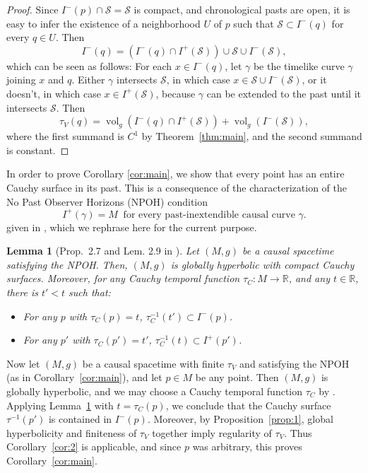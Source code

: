 \documentclass[a4paper,11pt]{amsart}
\newtheorem{lemma}[theorem]{{Lemma}}%
\newcommand{\R}{\mathbb{R}}
\newcommand{\Vol}{\operatorname{vol}_g}
\newcommand{\CS}{\mathcal{S}}
\begin{document}
\begin{proof}
    Since $I^-(p) \cap \CS = \CS$ is compact, and chronological pasts are open, it is easy to infer the existence of a neighborhood $U$ of $p$ such that $\CS \subset I^-(q)$ for every $q \in U$. Then
    \begin{equation*}
        I^-(q) = \left(I^-(q) \cap I^+(\CS)\right) \cup \CS \cup I^-(\CS),
    \end{equation*}
    which can be seen as follows: For each $x \in I^-(q)$, let $\gamma$ be the timelike curve $\gamma$ joining $x$ and $q$. Either $\gamma$ intersects $\CS$, in which case $x \in \CS \cup I^-(\CS)$, or it doesn't, in which case $x \in I^+(\CS)$, because $\gamma$ can be extended to the past until it intersects $\CS$. Then
    \begin{equation*}
        \tau_V(q) = \Vol\left(I^-(q) \cap I^+(\CS)\right) + \Vol\left(I^-(\CS)\right),
    \end{equation*}
    where the first summand is $C^1$ by Theorem~\ref{thm:main}, and the second summand is constant.
\end{proof}

In order to prove Corollary \ref{cor:main}, we show that every point has an entire Cauchy surface in its past. This is a consequence of the characterization of the No Past Observer Horizons (NPOH) condition
\begin{equation*}
     I^+(\gamma) = M \ \text{ for every past-inextendible causal curve } \gamma.
\end{equation*}
given in \cite{GaZe}, which we rephrase here for the current purpose.

\begin{lemma}[Prop.~2.7 and Lem. 2.9 in \cite{GaZe}] \label{lem:NPOH}
    Let $(M,g)$ be a causal spacetime satisfying the  NPOH. Then, $(M,g)$ is globally hyperbolic with compact Cauchy surfaces. Moreover, for any Cauchy temporal function $\tau_C \colon M \to \R$, and any $t \in \R$, there is $t' < t$ such that:
    \begin{itemize}
        \item For any $p$ with $\tau_C(p) = t$, $\tau_C^{-1}(t') \subset I^-(p)$.
        \item For any $p'$ with $\tau_C(p') = t'$, $\tau_C^{-1}(t) \subset I^+(p')$.
    \end{itemize}
\end{lemma}

Now let $(M,g)$ be a causal spacetime with finite $\tau_V$ and satisfying the NPOH (as in Corollary~\ref{cor:main}), and let $p \in M$ be any point. Then $(M,g)$ is globally hyperbolic, and we may choose a Cauchy temporal function $\tau_C$ by \cite{BeSa05}. Applying Lemma~\ref{lem:NPOH} with $t = \tau_C(p)$, we conclude that the Cauchy surface $\tau^{-1}(p')$ is contained in $I^-(p)$. Moreover, by Proposition~\ref{prop:1}, global hyperbolicity and finiteness of $\tau_V$ together imply regularity of $\tau_V$. Thus Corollary~\ref{cor:2} is applicable, and since $p$ was arbitrary, this proves Corollary~\ref{cor:main}.
\end{document}
